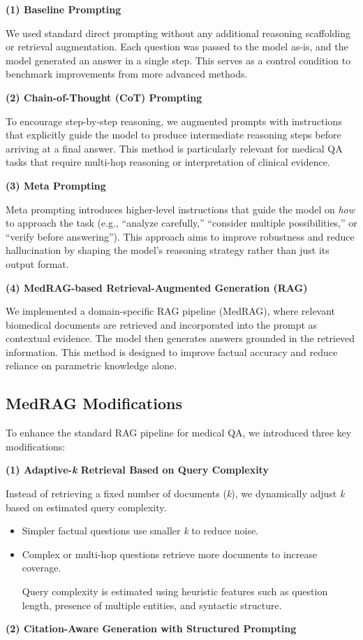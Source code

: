 \documentclass{article}
\begin{document}
\textbf{(1) Baseline Prompting}

 We used standard direct prompting without any additional reasoning scaffolding or retrieval augmentation. Each question was passed to the model as-is, and the model generated an answer in a single step. This serves as a control condition to benchmark improvements from more advanced methods.

\textbf{(2) Chain-of-Thought (CoT) Prompting}

 To encourage step-by-step reasoning, we augmented prompts with instructions that explicitly guide the model to produce intermediate reasoning steps before arriving at a final answer. This method is particularly relevant for medical QA tasks that require multi-hop reasoning or interpretation of clinical evidence.

\textbf{(3) Meta Prompting}

 Meta prompting introduces higher-level instructions that guide the model on \textit{how} to approach the task (e.g., “analyze carefully,” “consider multiple possibilities,” or “verify before answering”). This approach aims to improve robustness and reduce hallucination by shaping the model’s reasoning strategy rather than just its output format.

\textbf{(4) MedRAG-based Retrieval-Augmented Generation (RAG)}

 We implemented a domain-specific RAG pipeline (MedRAG), where relevant biomedical documents are retrieved and incorporated into the prompt as contextual evidence. The model then generates answers grounded in the retrieved information. This method is designed to improve factual accuracy and reduce reliance on parametric knowledge alone.

\subsection{MedRAG Modifications}
To enhance the standard RAG pipeline for medical QA, we introduced three key modifications:

\textbf{(1) Adaptive-\textit{k} Retrieval Based on Query Complexity}

 Instead of retrieving a fixed number of documents (\textit{k}), we dynamically adjust \textit{k} based on estimated query complexity.

\begin{itemize}
    \item Simpler factual questions use smaller \textit{k} to reduce noise. 
    \item Complex or multi-hop questions retrieve more documents to increase coverage.

 Query complexity is estimated using heuristic features such as question length, presence of multiple entities, and syntactic structure. 
\end{itemize}
\textbf{(2) Citation-Aware Generation with Structured Prompting}
\end{document}
